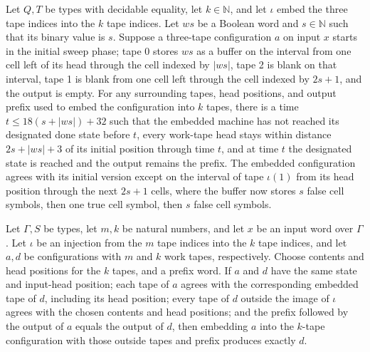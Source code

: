 \begin{theorem}
\label{Turing.rt_cellWindow_embed_run}
\leanok
{}
Let $Q,T$ be types with decidable equality, let $k\in\mathbb{N}$, and let $\iota$ embed
the three tape indices into the $k$ tape indices. Let $ws$ be a Boolean word and
$s\in\mathbb{N}$ such that its binary value is $s$. Suppose a three-tape configuration
$a$ on input $x$ starts in the initial sweep phase; tape 0 stores $ws$ as a buffer on
the interval from one cell left of its head through the cell indexed by $|ws|$, tape 2
is blank on that interval, tape 1 is blank from one cell left through the cell indexed
by $2s+1$, and the output is empty. For any surrounding tapes, head positions, and
output prefix used to embed the configuration into $k$ tapes, there is a time
$t\le18(s+|ws|)+32$ such that the embedded machine has not reached its designated done
state before $t$, every work-tape head stays within distance $2s+|ws|+3$ of its initial
position through time $t$, and at time $t$ the designated state is reached and the
output remains the prefix. The embedded configuration agrees with its initial version
except on the interval of tape $\iota(1)$ from its head position through the next $2s+1$
cells, where the buffer now stores $s$ false cell symbols, then one true cell symbol,
then $s$ false cell symbols.
\end{theorem}

\begin{theorem}
\label{Turing.rt_embed_matches}
\leanok
{}
Let $\Gamma,S$ be types, let $m,k$ be natural numbers, and let $x$ be an input word over
$\Gamma$. Let $\iota$ be an injection from the $m$ tape indices into the $k$ tape
indices, and let $a,d$ be configurations with $m$ and $k$ work tapes, respectively.
Choose contents and head positions for the $k$ tapes, and a prefix word. If $a$ and $d$
have the same state and input-head position; each tape of $a$ agrees with the
corresponding embedded tape of $d$, including its head position; every tape of $d$
outside the image of $\iota$ agrees with the chosen contents and head positions; and the
prefix followed by the output of $a$ equals the output of $d$, then embedding $a$ into
the $k$-tape configuration with those outside tapes and prefix produces exactly $d$.
\end{theorem}

